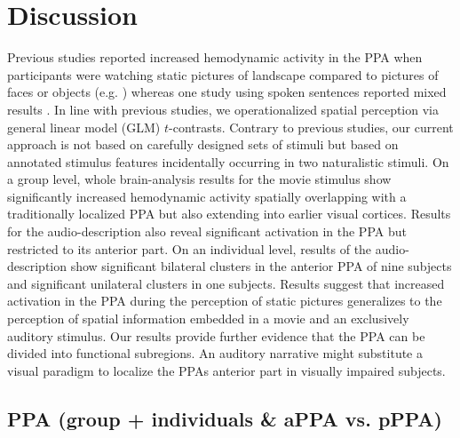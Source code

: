\documentclass[english]{article}
\begin{document}
\section{Discussion}






Previous studies reported increased hemodynamic activity in the PPA when
participants were watching static pictures of landscape compared to pictures of
faces or objects (e.g. \citep{epstein1998ppa, epstein1999parahippocampal})
whereas one study using spoken sentences reported mixed results
\citep{aziz2008modulation}.
In line with previous studies, we operationalized spatial perception via general
linear model (GLM) $t$-contrasts.
Contrary to previous studies, our current approach is not based on carefully
designed sets of stimuli but based on annotated stimulus features incidentally
occurring in two naturalistic stimuli.
On a group level, whole brain-analysis results for the movie stimulus show
significantly increased hemodynamic activity spatially overlapping with a
traditionally localized PPA but also extending into earlier visual cortices.
Results for the audio-description also reveal significant activation in the PPA
but restricted to its anterior part.
On an individual level, results of the audio-description show significant
bilateral clusters in the anterior PPA of nine subjects and significant
unilateral clusters in one subjects.
Results suggest that increased activation in the PPA during the perception of
static pictures generalizes to the perception of spatial information embedded in
a movie and an exclusively auditory stimulus.
Our results provide further evidence that the PPA can be divided into functional
subregions.
An auditory narrative might substitute a visual paradigm to localize
the PPAs anterior part in visually impaired subjects.


\subsection{PPA (group + individuals \& aPPA vs. pPPA)}
\end{document}
